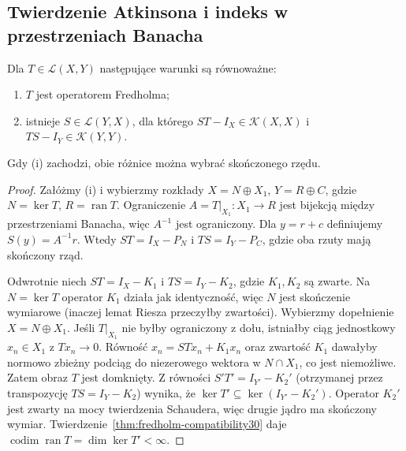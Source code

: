 \subsection{Twierdzenie Atkinsona i indeks w przestrzeniach Banacha}

\begin{twierdzenie}
\label{thm:atkinson30}
Dla $T\in\mathcal L(X,Y)$ następujące warunki są równoważne:
\begin{enumerate}[label=\textup{(\roman*)}]
\item $T$ jest operatorem Fredholma;
\item istnieje $S\in\mathcal L(Y,X)$, dla którego
$ST-I_X\in\mathcal K(X,X)$ i $TS-I_Y\in\mathcal K(Y,Y)$.
\end{enumerate}
Gdy (i) zachodzi, obie różnice można wybrać skończonego rzędu.
\end{twierdzenie}
\begin{proof}
Załóżmy (i) i wybierzmy rozkłady $X=N\oplus X_1$,
$Y=R\oplus C$, gdzie $N=\ker T$, $R=\operatorname{ran}T$.
Ograniczenie $A=T|_{X_1}:X_1\to R$ jest bijekcją między
przestrzeniami Banacha, więc $A^{-1}$ jest ograniczony.
Dla $y=r+c$ definiujemy $S(y)=A^{-1}r$.
Wtedy $ST=I_X-P_N$ i $TS=I_Y-P_C$, gdzie oba rzuty
mają skończony rząd.

Odwrotnie niech $ST=I_X-K_1$ i $TS=I_Y-K_2$,
gdzie $K_1,K_2$ są zwarte. Na $N=\ker T$ operator
$K_1$ działa jak identyczność, więc $N$ jest skończenie
wymiarowe (inaczej lemat Riesza przeczyłby zwartości).
Wybierzmy dopełnienie $X=N\oplus X_1$.
Jeśli $T|_{X_1}$ nie byłby ograniczony z dołu, istniałby
ciąg jednostkowy $x_n\in X_1$ z $Tx_n\to0$.
Równość $x_n=STx_n+K_1x_n$ oraz zwartość $K_1$
dawałyby normowo zbieżny podciąg do niezerowego wektora
w $N\cap X_1$, co jest niemożliwe. Zatem obraz $T$
jest domknięty.
Z równości $S'T'=I_{Y'}-K_2'$ (otrzymanej przez
transpozycję $TS=I_Y-K_2$) wynika, że
$\ker T'\subseteq\ker(I_{Y'}-K_2')$.
Operator $K_2'$ jest zwarty na mocy twierdzenia Schaudera,
więc drugie jądro ma skończony wymiar.
Twierdzenie~\ref{thm:fredholm-compatibility30} daje
$\operatorname{codim}\operatorname{ran}T=\dim\ker T'<\infty$.
\end{proof}

